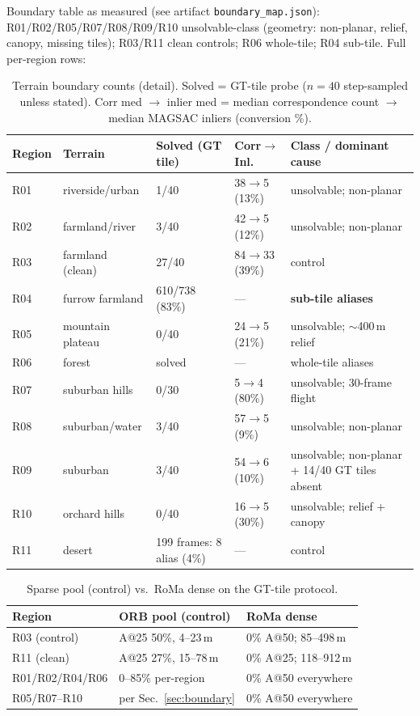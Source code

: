 \documentclass[journal]{IEEEtran}
\begin{document}
\begin{table}[h]
\caption{Terrain boundary of the alias classes (from Sec.~4.5).}
\label{tab:terrain-app}
\centering
\footnotesize
Boundary table as measured (see artifact \texttt{boundary\_map.json}):
R01/R02/R05/R07/R08/R09/R10 unsolvable-class (geometry: non-planar, relief, canopy, missing tiles);
R03/R11 clean controls; R06 whole-tile; R04 sub-tile. Full per-region rows:
\end{table}
\begin{table}[t]
\caption{Terrain boundary counts (detail). Solved = GT-tile probe ($n=40$ step-sampled unless stated). Corr med $\to$ inlier med = median correspondence count $\to$ median MAGSAC inliers (conversion \%).}
\label{tab:terrain}
\centering
\footnotesize
\begin{tabular}{@{}lllll@{}}
\toprule
Region & Terrain & Solved (GT tile) & Corr$\to$Inl. & Class / dominant cause \\
\midrule
R01 & riverside/urban & 1/40 & 38$\to$5 (13\%) & unsolvable; non-planar \\
R02 & farmland/river & 3/40 & 42$\to$5 (12\%) & unsolvable; non-planar \\
R03 & farmland (clean) & 27/40 & 84$\to$33 (39\%) & control \\
R04 & furrow farmland & 610/738 (83\%) & --- & \textbf{sub-tile aliases} \\
R05 & mountain plateau & 0/40 & 24$\to$5 (21\%) & unsolvable; $\sim$400\,m relief \\
R06 & forest & solved & --- & whole-tile aliases \\
R07 & suburban hills & 0/30 & 5$\to$4 (80\%) & unsolvable; 30-frame flight \\
R08 & suburban/water & 3/40 & 57$\to$5 (9\%) & unsolvable; non-planar \\
R09 & suburban & 3/40 & 54$\to$6 (10\%) & unsolvable; non-planar + 14/40 GT tiles absent \\
R10 & orchard hills & 0/40 & 16$\to$5 (30\%) & unsolvable; relief + canopy \\
R11 & desert & 199 frames: 8 alias (4\%) & --- & control \\
\bottomrule
\end{tabular}
\end{table}
\begin{table}[t]
\caption{Sparse pool (control) vs.\ RoMa dense on the GT-tile protocol.}
\label{tab:dense}
\centering
\footnotesize
\begin{tabular}{@{}lll@{}}
\toprule
Region & ORB pool (control) & RoMa dense \\
\midrule
R03 (control) & A@25 50\%, 4--23\,m & 0\% A@50; 85--498\,m \\
R11 (clean) & A@25 27\%, 15--78\,m & 0\% A@25; 118--912\,m \\
R01/R02/R04/R06 & 0--85\% per-region & 0\% A@50 everywhere \\
R05/R07--R10 & per Sec.~\ref{sec:boundary} & 0\% A@50 everywhere \\
\bottomrule
\end{tabular}
\end{table}
\end{document}
